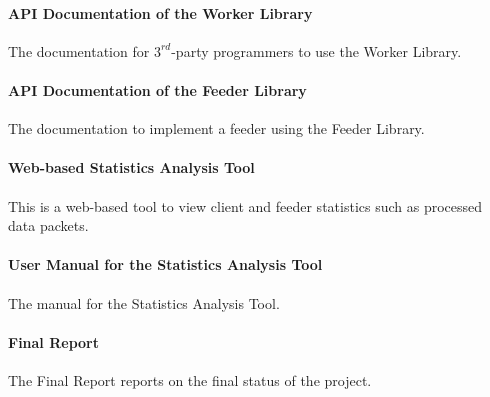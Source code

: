 \paragraph{API Documentation of the Worker Library} The documentation for $3^{rd}$-party programmers to use the Worker Library.
\paragraph{API Documentation of the Feeder Library} The documentation to implement a feeder using the Feeder Library.
\paragraph{Web-based Statistics Analysis Tool} This is a web-based tool to view client and feeder statistics such as processed data packets.
\paragraph{User Manual for the Statistics Analysis Tool} The manual for the Sta\-tis\-tics Analysis Tool.
\paragraph{Final Report} The Final Report reports on the final status of the project.
